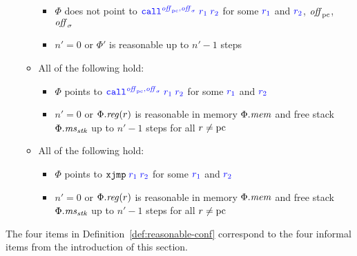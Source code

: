 \documentclass[acmsmall,screen]{acmart}\settopmatter{}
\newenvironment{jversion}%
    {\color{OliveGreen}}{}
\begin{document}
\begin{jversion}
\begin{definition}
\begin{enumerate}
\begin{itemize}
\begin{itemize}
        \item $\Phi$ does not point to $\src{\scall{\offpc,\offsigma}{r_1}{r_2}}$ for some ${\color{blue} r_1}$ and ${\color{blue} r_2}$, $\mathit{off}_{\mathrm{pc}}$, $\mathit{off}_\sigma$
        \item $n' = 0$ or $\Phi'$ is reasonable up to $n'-1$ steps
        \end{itemize}
      \item All of the following hold:
        \begin{itemize}
        \item $\Phi$ points to $\src{\scall{\offpc,\offsigma}{r_1}{r_2}}$ for some ${\color{blue} r_1}$ and ${\color{blue} r_2}$
        \item $n' = 0$ or $\Phi.\reg(r)$ is reasonable in memory $\Phi.\mathit{mem}$ and free stack $\Phi.\mathit{ms}_{\mathit{stk}}$ up to $n'-1$ steps for all $r \neq \mathrm{pc}$
        \end{itemize}
      \item All of the following hold:
        \begin{itemize}
        \item $\Phi$ points to $\src{\txjmp{r_1}{r_2}}$ for some ${\color{blue} r_1}$ and ${\color{blue} r_2}$
        \item $n' = 0$ or $\Phi.\reg(r)$ is reasonable in memory $\Phi.\mathit{mem}$ and free stack $\Phi.\mathit{ms}_{\mathit{stk}}$ up to $n'-1$ steps for all $r \neq \mathrm{pc}$
        \end{itemize}
      \end{itemize}
    \end{enumerate}
  \end{definition}
The four items in Definition~\ref{def:reasonable-conf} correspond to the four informal items from the introduction of this section.


\end{jversion}
\end{document}
